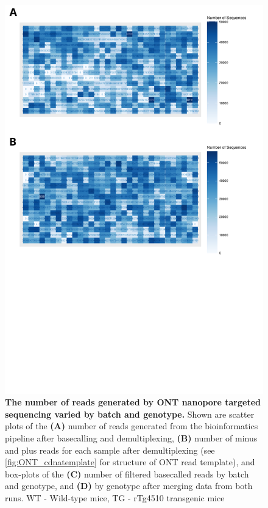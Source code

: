 \begin{figure}[!htp]
	\centering
	\includegraphics[page=4,trim={0 0 0 0},clip,scale = 0.55]{Figures/ONTTargetedTranscriptome.pdf}
	\captionsetup{width=0.95\textwidth}
	\caption[ONT sequencing metrics from targeted profiling of rTg4510 mice]%
	{\textbf{The number of reads generated by ONT nanopore targeted sequencing varied by batch and genotype.} Shown are scatter plots of the \textbf{(A)} number of reads generated from the bioinformatics pipeline after basecalling and demultiplexing, \textbf{(B)} number of minus and plus reads for each sample after demultiplexing (see \cref{fig:ONT_cdnatemplate} for structure of ONT read template), and box-plots of the \textbf{(C)} number of filtered basecalled reads by batch and genotype, and \textbf{(D)} by genotype after merging data from both runs. WT - Wild-type mice, TG - rTg4510 transgenic mice}
	\label{fig:ONT_targeted_run_output}
\end{figure}

